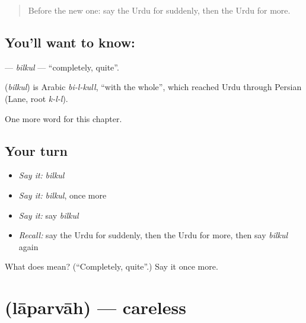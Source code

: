 \label{lesson:UR-C195-bilkul}



\begin{quote}
Before the new one: say the Urdu for suddenly, then the Urdu for more.
\end{quote}

\subsection*{You'll want to know: }
\textbf{} — \emph{bilkul} — \textquotedblleft{}completely, quite\textquotedblright{}.

\begin{cousinweb}
\textbf{} (\emph{bilkul}) is Arabic \emph{bi-l-kull}, \textquotedblleft{}with the whole\textquotedblright{}, which reached Urdu through Persian (Lane, root \emph{k-l-l}).
\end{cousinweb}

\begin{grammarlens}[title={What you've built}]
One more word for this chapter.
\end{grammarlens}

\subsection*{Your turn}
\begin{itemize}
\raggedright
  \item \emph{Say it:} \emph{bilkul}
  \item \emph{Say it:} \emph{bilkul}, once more
  \item \emph{Say it:} say \emph{bilkul}
  \item \emph{Recall:} say the Urdu for suddenly, then the Urdu for more, then say \emph{bilkul} again
\end{itemize}

\begin{tcolorbox}[breakable,colback=teal!4,colframe=teal!35!black,title={Before you move on}]
What does  mean? (\textquotedblleft{}Completely, quite\textquotedblright{}.) Say it once more.
\end{tcolorbox}
\section[\texorpdfstring{\ur{لاپرواہ} (lāparvāh)}{لاپرواہ (lāparvāh)}]{ (lāparvāh) — careless}

\label{lesson:UR-C195-laparvah}



